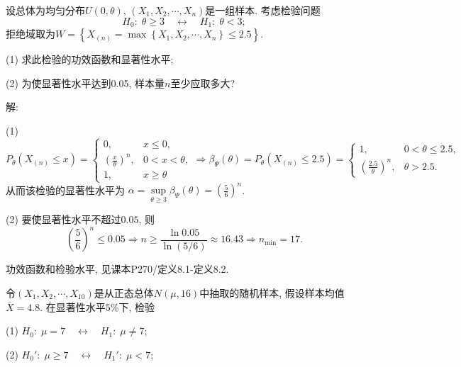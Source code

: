 \documentclass[standard]{ExBook}
\renewenvironment{shaded}{%
  \def\FrameCommand{\fboxsep=\FrameSep \colorbox{shadecolor}}%
  \MakeFramed{\advance\hsize-\width \FrameRestore}%
}{%
  \endMakeFramed
}
\begin{document}
\begin{qitems}
    \begin{bbox} 
    \begin{shaded}
        \qitem
设总体为均匀分布$U(0, \theta)$, $\left(X_1,X_2,\cdots, X_n\right)$是一组样本. 考虑检验问题
\[
H_0: \; \theta \ge 3 \quad \longleftrightarrow \quad H_1: \; \theta < 3;
\]
拒绝域取为$W = \left\{X_{(n)} = \max\left\{X_1,X_2,\cdots,X_n\right\} \leq 2.5\right\}$.

(1) 求此检验的功效函数和显著性水平;

(2) 为使显著性水平达到0.05, 样本量$n$至少应取多大?
    \end{shaded}
    \end{bbox}

\vspace{\dimexpr2.5cm-5em\relax}

解:

(1)
$$
P_{\theta}(X_{(n)}\leq x)
=
\left\{
\begin{array}{ll}
0, & x\leq0,\\[0.3em]
\displaystyle\left(\frac{x}{\theta}\right)^n, & 0<x<\theta,\\[0.7em]
1, & x\geq\theta
\end{array}
\right.
\Longrightarrow
\beta_{\Psi}(\theta)
=
P_{\theta}(X_{(n)}\leq2.5)
=
\left\{
\begin{array}{ll}
1, & 0<\theta\leq2.5,\\[0.4em]
\displaystyle\left(\frac{2.5}{\theta}\right)^n, & \theta>2.5.
\end{array}
\right.
$$
从而该检验的显著性水平为
$
\alpha
=\sup\limits_{\theta\geq3}\beta_{\Psi}(\theta)
=\left(\frac{5}{6}\right)^n
$.

(2) 要使显著性水平不超过$0.05$, 则
$$
\left(\frac{5}{6}\right)^n\leq0.05
\Longrightarrow
n\geq\frac{\ln0.05}{\ln(5/6)}
\approx16.43
\Longrightarrow
n_{\min}=17.
$$

\textcolor{themeColor}{\selectfont {} 功效函数和检验水平, 见课本P270/定义8.1-定义8.2.}

\vspace{2.5cm-5em}

    \begin{bbox} 
    \begin{shaded}
        \qitem
令$\left(X_1,X_2,\cdots,X_{10}\right)$是从正态总体$N(\mu, 16)$中抽取的随机样本, 假设样本均值$\overline{X} = 4.8$. 在显著性水平$5\%$下, 检验

(1) $H_0: \; \mu = 7 \quad \longleftrightarrow \quad H_1: \; \mu \neq 7$;

(2) $H_0': \; \mu \ge 7 \quad \longleftrightarrow \quad H_1': \; \mu < 7$;


\end{shaded}
\end{bbox}
\end{qitems}
\end{document}
